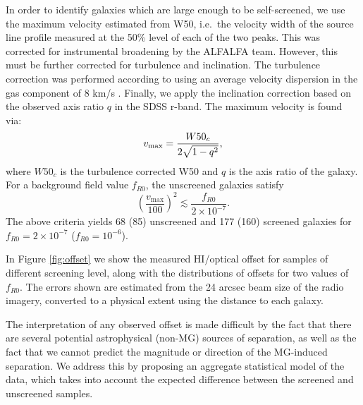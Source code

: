 \documentclass[useAMS,usenatbib,twocolumn]{mn2e}
\begin{document}
In order to identify galaxies which are large enough to be self-screened,
we use the maximum velocity estimated from W50, i.e.\ the
velocity width of the source
line profile measured at the 50\% level of each of the two peaks. This was
corrected for instrumental broadening by the ALFALFA team. However, this must
be further corrected for turbulence and inclination.
The turbulence correction was performed according to \citet{tully85} using an
average velocity dispersion in the gas component of 8 km/s \citep{begum06,
geha06}. Finally, we apply the inclination correction based on the observed
axis ratio $q$ in the SDSS r-band. The maximum velocity is found via:
\begin{equation}
  v_{\rm max} = \frac{W50_c}{2 \sqrt{1 - q^2}},
\end{equation}
where $W50_c$ is the turbulence corrected W50 and $q$ is the axis ratio of
the galaxy. For a background field value $f_{R0}$, the unscreened galaxies
satisfy  \citep[see][]{jainvinu2012}
\begin{equation}
  \left(\frac{v_{\mathrm{max}}}{100}\right)^2 \lesssim
  \frac{f_{R0}}{2\times10^{-7}}.
\label{eq:unscreened}
\end{equation}
The above criteria yields 68 (85) unscreened and 177 (160) screened galaxies
for $f_{R0} = 2 \times10^{-7}$ ($f_{R0} = 10^{-6}$).

In Figure \ref{fig:offset} we show the measured HI/optical
offset for samples of different screening level, along with the
distributions of offsets for two values of $f_{R0}$.
The errors shown are estimated from the 24 arcsec beam
size of the radio imagery, converted to a physical extent using the
distance to each galaxy.

The interpretation of any observed offset
is made difficult by the fact that there are several potential
astrophysical (non-MG) sources of separation, as well as the fact that we
cannot predict the magnitude or direction of the MG-induced separation.
We address this by proposing an aggregate statistical model of the data,
which takes into account the expected difference between the screened and
unscreened samples.
\end{document}
